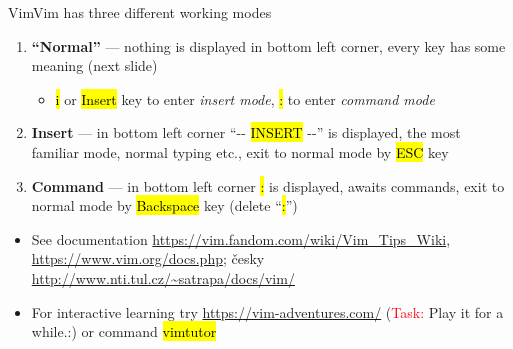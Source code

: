 \documentclass[compress, ucs, xelatex, 11pt, xcolor=svgnames, aspectratio=169,
	hyperref={
		bookmarks=true,
		unicode=true,
		colorlinks=true,
		pdftitle={Linux, command line and MetaCentrum},
		plainpages=false,
		pdfauthor={Vojtech Zeisek},
		pdfsubject={Course about use of Linux command line, writing shell scripts and using MetaCentrum of CESNET},
		pdfcreator={XeLaTeX},
		pdfkeywords={Linux, GNU, BASH, shell, command line, MetaCentrum},
		linkcolor=DarkRed, %
		anchorcolor=DarkBlue, %
		citecolor=Indigo, %
		filecolor=NavyBlue, %
		menucolor=DarkMagenta, %
		urlcolor=DarkBlue, %
		pdftex},
	url={hyphens, lowtilde} %
	]{beamer}
\renewcommand{\texttt}[1]{\hl{\ttfamily #1}}
\renewcommand{\alert}[1]{\textcolor{red}{#1}}
\begin{document}
\begin{frame}{Vim}{Vim has three different working modes} %
	\label{vim}
	\begin{enumerate}
		\item \textbf{\enquote{Normal}} --- nothing is displayed in bottom left corner, every key has some meaning (next slide)
		\begin{itemize}
			\item \texttt{i} or \texttt{Insert} key to enter \textit{insert mode}, \texttt{:} to enter \textit{command mode}
		\end{itemize}
		\item \textbf{Insert} --- in bottom left corner \enquote{{-}- \texttt{INSERT} -{-}} is displayed, the most familiar mode, normal typing etc., exit to normal mode by \texttt{ESC} key
		\item \textbf{Command} --- in bottom left corner \texttt{:} is displayed, awaits commands, exit to normal mode by \texttt{Backspace} key (delete \enquote{\texttt{:}})
	\end{enumerate}
	\begin{itemize}
		\item See documentation \url{https://vim.fandom.com/wiki/Vim_Tips_Wiki}, \url{https://www.vim.org/docs.php}; česky \url{http://www.nti.tul.cz/~satrapa/docs/vim/}
		\item For interactive learning try \url{https://vim-adventures.com/} (\alert{Task:} Play it for a while.:) or command \texttt{vimtutor}
	\end{itemize}
\end{frame}
\end{document}
